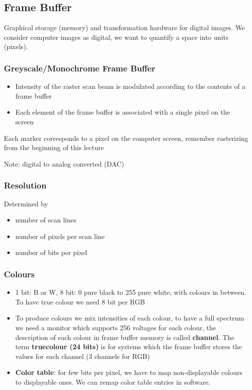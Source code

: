 \documentclass[11pt]{article}
\begin{document}
\subsection{Frame Buffer}
Graphical storage (memory) and transformation hardware for digital images. We consider computer images as digital, we want to quantify a space into units (pixels).

\subsubsection{Greyscale/Monochrome Frame Buffer}
\begin{itemize}
    \item Intensity of the raster scan beam is modulated according to the contents of a frame buffer
    \item Each element of the frame buffer is associated with a single pixel on the screen
\end{itemize}
Each marker corresponds to a pixel on the computer screen, remember rasterizing from the beginning of this lecture

\noindent
Note: digital to analog converted (DAC)

\subsubsection{Resolution}
Determined by 
\begin{itemize}
    \item number of scan lines
    \item number of pixels per scan line
    \item number of bits per pixel
\end{itemize}

\subsubsection{Colours}

\begin{itemize} 
    \item 1 bit: B or W, 8 bit: 0 pure black to 255 pure white, with colours in between. To have true colour we need 8 bit per RGB
    \item To produce colours we mix intensities of each colour, to have a full spectrum we need a monitor which supports 256 voltages for each colour, the description of each colour in frame buffer memory is called \textbf{channel}. The term \textbf{truecolour (24 bits)} is for systems which the frame buffer stores the values for each channel (3 channels for RGB) 
    \item \textbf{Color table}: for few bits per pixel, we have to map non-displayable colours to displayable ones. We can remap color table entries in software. 
\end{itemize}
\end{document}
